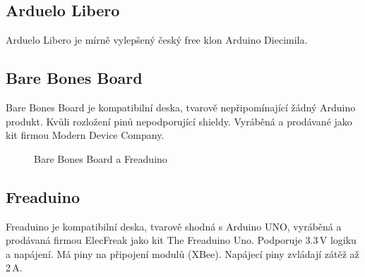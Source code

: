 	\subsection{Arduelo Libero}	
	Arduelo Libero je mírně vylepšený český free klon Arduino Diecimila.
	
	\subsection{Bare Bones Board} 
	Bare Bones Board je kompatibilní deska, tvarově nepřipomínající žádný Arduino produkt. Kvůli rozložení pinů nepodporující shieldy. Vyráběná a prodávané jako kit firmou Modern Device Company.
	
	\begin{figure}[!ht]
	\vspace{-10pt}	
    \centering
			\hspace*{5mm}
					\caption{Bare Bones Board a Freaduino}
					\vspace{-20pt}	
	\end{figure}	
		
	\subsection{Freaduino} 
	Freaduino je kompatibilní deska, tvarově shodná s Arduino UNO, vyráběná a prodávaná firmou ElecFreak jako kit The Freaduino Uno. Podporuje 3.3\,V logiku a napájení. Má piny na připojení modulů (XBee). Napájecí piny zvládají zátěž až 2\,A.
	
